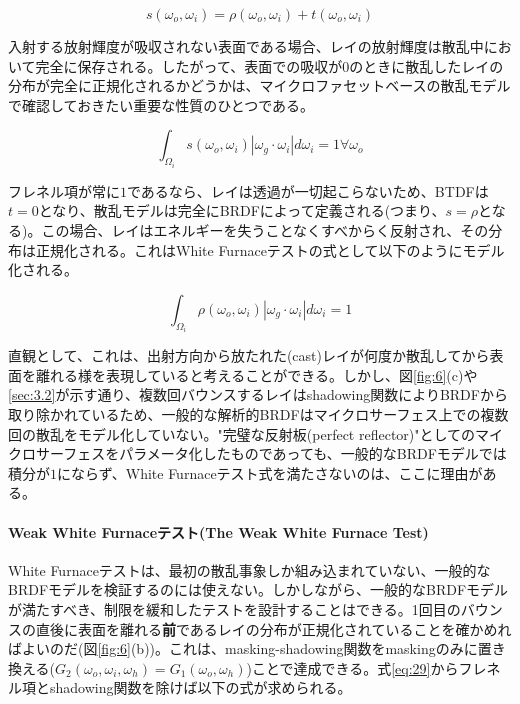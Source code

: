 \documentclass[a4j,xelatex,ja=standard]{bxjsarticle}
\begin{document}
\begin{equation}
    s(\omega_o, \omega_i) = \rho(\omega_o, \omega_i) + t(\omega_o, \omega_i)
    \label{eq:32}
\end{equation}

入射する放射輝度が吸収されない表面である場合、レイの放射輝度は散乱中において完全に保存される。したがって、表面での吸収が$0$のときに散乱したレイの分布が完全に正規化されるかどうかは、マイクロファセットベースの散乱モデルで確認しておきたい重要な性質のひとつである。

\begin{equation}
    \int_{\Omega_i} s(\omega_o, \omega_i) |\omega_g \cdot \omega_i| d\omega_i = 1 \forall \omega_o
    \label{eq:33}
\end{equation}

フレネル項が常に$1$であるなら、レイは透過が一切起こらないため、BTDFは$t = 0$となり、散乱モデルは完全にBRDFによって定義される(つまり、$s = \rho$となる)。この場合、レイはエネルギーを失うことなくすべからく反射され、その分布は正規化される。これはWhite Furnaceテストの式として以下のようにモデル化される。

\begin{equation}
    \int_{\Omega_i} \rho(\omega_o, \omega_i) |\omega_g \cdot \omega_i| d\omega_i = 1
    \label{eq:34}
\end{equation}

直観として、これは、出射方向から放たれた(cast)レイが何度か散乱してから表面を離れる様を表現していると考えることができる。しかし、図\ref{fig:6}(c)や\ref{sec:3.2}が示す通り、複数回バウンスするレイはshadowing関数によりBRDFから取り除かれているため、一般的な解析的BRDFはマイクロサーフェス上での複数回の散乱をモデル化していない。"完璧な反射板(perfect reflector)"としてのマイクロサーフェスをパラメータ化したものであっても、一般的なBRDFモデルでは積分が$1$にならず、White Furnaceテスト式を満たさないのは、ここに理由がある。

\paragraph{Weak White Furnaceテスト(The Weak White Furnace Test)}

White Furnaceテストは、最初の散乱事象しか組み込まれていない、一般的なBRDFモデルを検証するのには使えない。しかしながら、一般的なBRDFモデルが満たすべき、制限を緩和したテストを設計することはできる。1回目のバウンスの直後に表面を離れる\textbf{前}であるレイの分布が正規化されていることを確かめればよいのだ(図\ref{fig:6}(b))。これは、masking-shadowing関数をmaskingのみに置き換える($G_2(\omega_o, \omega_i, \omega_h) = G_1(\omega_o, \omega_h)$)ことで達成できる。式\eqref{eq:29}からフレネル項とshadowing関数を除けば以下の式が求められる。
\end{document}
